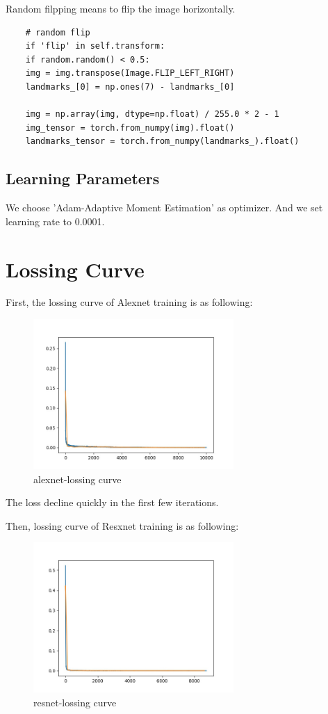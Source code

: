 \documentclass{article}
\begin{document}
Random filpping means to flip the image horizontally. 

\begin{commandline}
	\begin{verbatim}
	# random flip
	if 'flip' in self.transform:
	if random.random() < 0.5:
	img = img.transpose(Image.FLIP_LEFT_RIGHT)
	landmarks_[0] = np.ones(7) - landmarks_[0]
	
	img = np.array(img, dtype=np.float) / 255.0 * 2 - 1
	img_tensor = torch.from_numpy(img).float()
	landmarks_tensor = torch.from_numpy(landmarks_).float()
	\end{verbatim}
\end{commandline}

\subsection{Learning Parameters}
 We  choose 'Adam-Adaptive Moment Estimation' as optimizer. And we set learning rate to 0.0001.
 
 


	
\newpage
\section{Lossing Curve }

First, the lossing curve of Alexnet training is as following:

\begin{figure}[!h]
	\centering
	\includegraphics[width=3in]{alexloss}
	\caption{alexnet-lossing curve}
\end{figure}

The loss decline quickly in the first few iterations. 

Then, lossing curve of Resxnet training is as following:

\begin{figure}[!h]
	\centering
	\includegraphics[width=3in]{resloss.jpg}
	\caption{resnet-lossing curve}
\end{figure}
\end{document}
